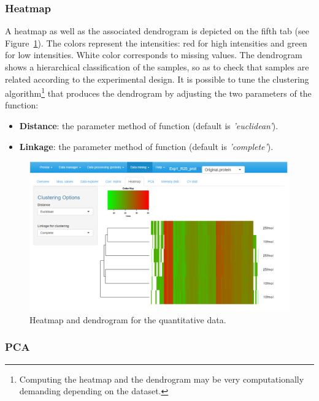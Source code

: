 \documentclass[12pt]{article}
\begin{document}
\subsubsection {Heatmap}
A heatmap as well as the associated dendrogram is depicted on the fifth tab (see Figure~\ref{fig:sdhm}). The colors represent the intensities: red for high intensities and green for low intensities. White color corresponds to missing values. The dendrogram shows a hierarchical classification of the samples, so as to check that samples are related according to the experimental design. It is possible to tune the clustering algorithm\footnote{Computing the heatmap and the dendrogram may be very computationally demanding depending on the dataset.} that produces the dendrogram by adjusting the two parameters of the  \R{} function:
\begin {itemize}
\item \textbf{Distance}: the parameter method of  function (default is \emph{'euclidean'}).
\item \textbf{Linkage}: the parameter method of  function (default is \emph{'complete'}).
\end {itemize}

\begin {figure}
\includegraphics{images/desc_heatmap.png}
\caption{Heatmap and dendrogram for the quantitative data.}\label{fig:sdhm}
\end {figure}

\subsubsection {PCA}\label{sec:pca}
\end{document}
